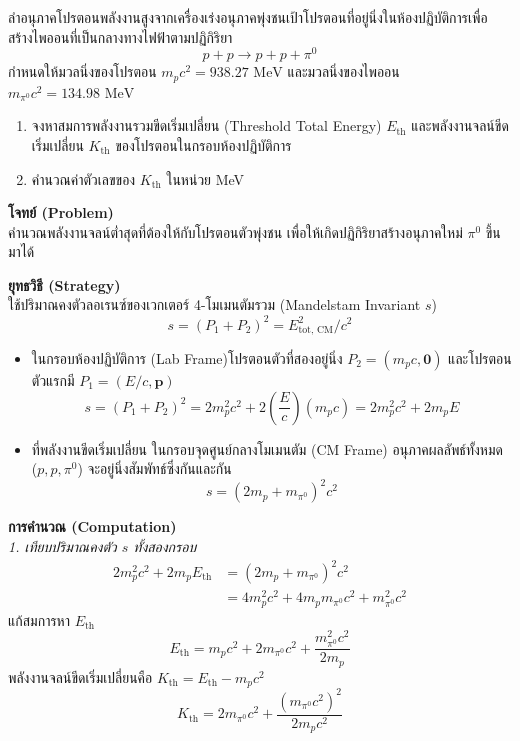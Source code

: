 \begin{psctexample}
ลำอนุภาคโปรตอนพลังงานสูงจากเครื่องเร่งอนุภาคพุ่งชนเป้าโปรตอนที่อยู่นิ่งในห้องปฏิบัติการเพื่อสร้างไพออนที่เป็นกลางทางไฟฟ้าตามปฏิกิริยา
\begin{equation}
p + p \to p + p + \pi^0
\end{equation}
กำหนดให้มวลนิ่งของโปรตอน $m_p c^2 = 938.27\text{ MeV}$ และมวลนิ่งของไพออน $m_{\pi^0} c^2 = 134.98\text{ MeV}$
\begin{enumerate}
    \item จงหาสมการพลังงานรวมขีดเริ่มเปลี่ยน (Threshold Total Energy) $E_{\text{th}}$ และพลังงานจลน์ขีดเริ่มเปลี่ยน $K_{\text{th}}$ ของโปรตอนในกรอบห้องปฏิบัติการ
    \item คำนวณค่าตัวเลขของ $K_{\text{th}}$ ในหน่วย MeV
\end{enumerate}

\textbf{โจทย์ (Problem)} \\
คำนวณพลังงานจลน์ต่ำสุดที่ต้องให้กับโปรตอนตัวพุ่งชน เพื่อให้เกิดปฏิกิริยาสร้างอนุภาคใหม่ $\pi^0$ ขึ้นมาได้

\textbf{ยุทธวิธี (Strategy)} \\
ใช้ปริมาณคงตัวลอเรนซ์ของเวกเตอร์ 4-โมเมนตัมรวม (Mandelstam Invariant $s$)
\begin{equation}
s = (P_1 + P_2)^2 = E_{\text{tot, CM}}^2 / c^2
\end{equation}
\begin{itemize}
    \item ในกรอบห้องปฏิบัติการ (Lab Frame)\quad โปรตอนตัวที่สองอยู่นิ่ง $P_2 = (m_p c, \mathbf{0})$ และโปรตอนตัวแรกมี $P_1 = (E/c, \mathbf{p})$
    \begin{equation}
    s = (P_1 + P_2)^2 = 2 m_p^2 c^2 + 2 \left(\frac{E}{c}\right) (m_p c) = 2 m_p^2 c^2 + 2 m_p E
    \end{equation}
    \item ที่พลังงานขีดเริ่มเปลี่ยน ในกรอบจุดศูนย์กลางโมเมนตัม (CM Frame) อนุภาคผลลัพธ์ทั้งหมด ($p, p, \pi^0$) จะอยู่นิ่งสัมพัทธ์ซึ่งกันและกัน
    \begin{equation}
    s = (2 m_p + m_{\pi^0})^2 c^2
    \end{equation}
\end{itemize}

\textbf{การคำนวณ (Computation)} \\
\textit{1. เทียบปริมาณคงตัว $s$ ทั้งสองกรอบ}
\begin{align}
2 m_p^2 c^2 + 2 m_p E_{\text{th}} &= (2 m_p + m_{\pi^0})^2 c^2 \nonumber \\
&= 4 m_p^2 c^2 + 4 m_p m_{\pi^0} c^2 + m_{\pi^0}^2 c^2
\end{align}
แก้สมการหา $E_{\text{th}}$
\begin{equation}
E_{\text{th}} = m_p c^2 + 2 m_{\pi^0} c^2 + \frac{m_{\pi^0}^2 c^2}{2 m_p}
\end{equation}
พลังงานจลน์ขีดเริ่มเปลี่ยนคือ $K_{\text{th}} = E_{\text{th}} - m_p c^2$
\begin{equation}
K_{\text{th}} = 2 m_{\pi^0} c^2 + \frac{(m_{\pi^0} c^2)^2}{2 m_p c^2}
\end{equation}


\end{psctexample}
